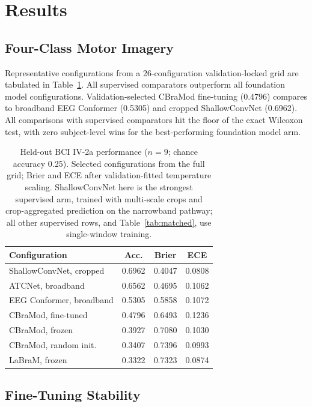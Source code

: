 \documentclass[conference]{IEEEtran}
\begin{document}
\section{Results}

\subsection{Four-Class Motor Imagery}

Representative configurations from a 26-configuration validation-locked grid are tabulated in Table~\ref{tab:main}. All supervised comparators outperform all foundation model configurations. Validation-selected CBraMod fine-tuning (0.4796) compares to broadband EEG Conformer (0.5305) and cropped ShallowConvNet (0.6962). All comparisons with supervised comparators hit the floor of the exact Wilcoxon test, with zero subject-level wins for the best-performing foundation model arm.

\begin{table}[t]
\centering
\caption{Held-out BCI IV-2a performance ($n=9$; chance accuracy 0.25). Selected configurations from the full grid; Brier and ECE after validation-fitted temperature scaling. ShallowConvNet here is the strongest supervised arm, trained with multi-scale crops and crop-aggregated prediction on the narrowband pathway; all other supervised rows, and Table~\ref{tab:matched}, use single-window training.}
\label{tab:main}
\small
\begin{tabular}{lccc}
\toprule
Configuration & Acc. & Brier & ECE \\
\midrule
ShallowConvNet, cropped  & 0.6962 & 0.4047 & 0.0808 \\
ATCNet, broadband        & 0.6562 & 0.4695 & 0.1062 \\
EEG Conformer, broadband & 0.5305 & 0.5858 & 0.1072 \\
CBraMod, fine-tuned      & 0.4796 & 0.6493 & 0.1236 \\
CBraMod, frozen          & 0.3927 & 0.7080 & 0.1030 \\
CBraMod, random init.    & 0.3407 & 0.7396 & 0.0993 \\
LaBraM, frozen           & 0.3322 & 0.7323 & 0.0874 \\
\bottomrule
\end{tabular}
\end{table}

\subsection{Fine-Tuning Stability}
\end{document}
